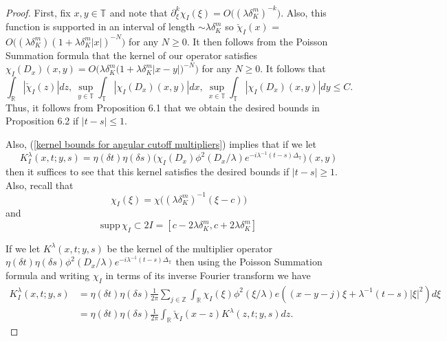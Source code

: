\documentclass[10pt,a4paper]{amsart}
\newcommand{\T}[1][]{\mathbb{T}^#1}
\newcommand{\Z}[1][]{\mathbb{Z}^#1}
\newcommand{\dK}[1]{\delta_{K}^{#1}}
\newcommand{\laplac}[1]{\Delta_{#1}}
\newcommand{\la}{\lambda}
\newcommand{\supp}[1]{\text{supp}\, #1}
\begin{document}
\begin{proof}
First, fix $x,y \in \T{}$ and note that $\partial_{\xi}^{k}\chi_{I}(\xi) = O\big( (\la \dK{m})^{-k}\big)$. Also, this function is supported in an interval of length $\sim \la \dK{m}$ so  $\check{\chi}_{I}(x)$ =  $O\big( (\la \dK{m})(1+\la \dK{m}|x|)^{-N}\big)$ for any $N \geq 0$. It then follows from the Poisson Summation formula that the kernel of our operator satisfies
$\chi_I(D_x)(x,y) = O\Big(\la \dK{m}\big(1 + \la \dK{m}|x- y|\big)^{-N}\Big)$ for any $N \geq 0$. It follows that
\begin{equation} \label{kernel bounds for angular cutoff multipliers}
    \int_{\mathbb{R}}|\check{\chi}_{I}(z)|dz, \ \sup_{y \in \mathbb{T}}\int_{\mathbb{T}} |\chi_{I}(D_x)(x,y)|dx , \ \sup_{x \in \mathbb{T}}\int_{\mathbb{T}} |\chi_{I}(D_x)(x,y)|dy \leq C.
\end{equation}
Thus, it follows from Proposition 6.1 that we obtain the desired bounds in Proposition 6.2 if $|t-s| \leq 1$.
\par
Also, (\ref{kernel bounds for angular cutoff multipliers}) implies that if we let 
\begin{equation}
    K^{\la}_{I}(x,t;y,s) = \eta(\delta t)\eta(\delta s)\big(\chi_{I}(D_x)\phi^{2}(D_x / \la)e^{-i\la^{-1}(t-s)\laplac{\T{}}}\big)(x,y)
\end{equation}
then it suffices to see that this kernel satisfies the desired bounds if $|t-s| \geq 1$. Also, recall that
\begin{equation} 
    \chi_I(\xi) = \chi\big((\la \dK{m})^{-1}(\xi - c)\big)
\end{equation}
and
\begin{equation} \label{support property of chi_I}
    \supp{\chi_I} \subset 2I = [c -2\la\dK{m}, c+2\la \dK{m} ]
\end{equation}
\par
If we let $K^{\la}(x,t;y,s)$ be the kernel of the multiplier operator $\eta(\delta t)\eta(\delta s)\phi^2(D_x/\la)e^{-i\la^{-1}(t-s)\laplac{\T{}}}$ then using the Poisson Summation formula and writing $\chi_{I}$ in terms of its inverse Fourier transform we have
\begin{equation} \label{K^(la, theta) Poisson summation 1}
\begin{split}
    K^{\la}_{I} (x,t;y,s) &= \eta(\delta t) \eta(\delta s)\frac{1}{2 \pi} \sum_{j \in \Z{}}\int_{\mathbb{R}} \chi_{I}(\xi)\phi^2(\xi/\la)e((x-y-j)\xi + \la^{-1}(t-s)|\xi|^2)d\xi\\
    &= \eta(\delta t) \eta(\delta s) \frac{1}{2\pi}\int_{\mathbb{R}} \check{\chi}_{I} (x - z)K^{\la}(z,t; y, s) dz.

\end{split}
\end{equation}
\end{proof}
\end{document}
